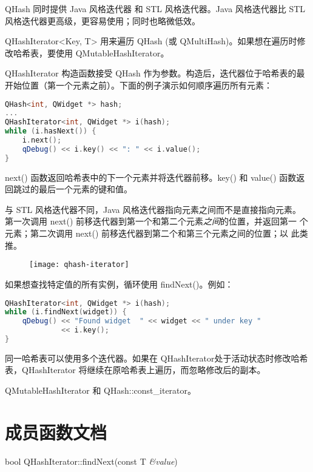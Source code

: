 QHash 同时提供 Java 风格迭代器 和 STL 风格迭代器。Java 风格迭代器比 STL 风格迭代器更高级，更容易使用；同时也略微低效。

QHashIterator<Key, T> 用来遍历 QHash (或 QMultiHash)。如果想在遍历时修改哈希表，要使用 QMutableHashIterator。

QHashIterator 构造函数接受 QHash 作为参数。构造后，迭代器位于哈希表的最开始位置（第一个元素之前）。下面的例子演示如何顺序遍历所有元素：

\begin{lstlisting}[language=C++]
QHash<int, QWidget *> hash;
...
QHashIterator<int, QWidget *> i(hash);
while (i.hasNext()) {
    i.next();
    qDebug() << i.key() << ": " << i.value();
}
\end{lstlisting}

next() 函数返回哈希表中的下一个元素并将迭代器前移。key() 和 value() 函数返回跳过的最后一个元素的键和值。

与 STL 风格迭代器不同，Java 风格迭代器指向元素之间而不是直接指向元素。
第一次调用 next() 前移迭代器到第一个和第二个元素\emph{之间}的位置，并返回第一
个元素；第二次调用 next() 前移迭代器到第二个和第三个元素之间的位置；以
此类推。


\begin{figure}[hbt!]  
	\centering
    \texttt{[image: qhash-iterator]}
\end{figure}

如果想查找特定值的所有实例，循环使用 findNext()。例如：

\begin{lstlisting}[language=C++]
QHashIterator<int, QWidget *> i(hash);
while (i.findNext(widget)) {
    qDebug() << "Found widget  " << widget << " under key "
             << i.key();
}
\end{lstlisting}

同一哈希表可以使用多个迭代器。如果在 QHashIterator处于活动状态时修改哈希表，QHashIterator 将继续在原哈希表上遍历，而忽略修改后的副本。


\begin{seeAlso}
QMutableHashIterator 和 QHash::const\_iterator。
\end{seeAlso}

\splitLine

\section{成员函数文档}

bool QHashIterator::findNext(const T \emph{\&value})


